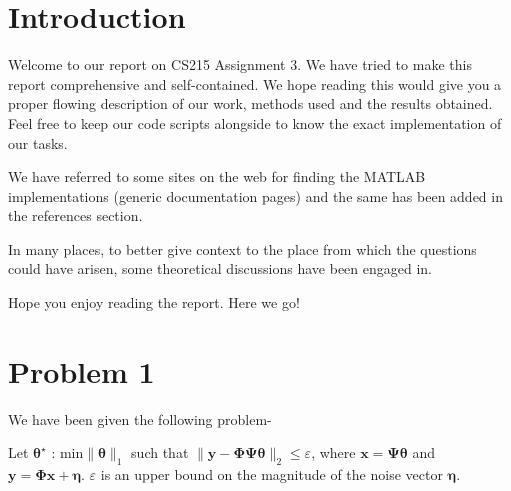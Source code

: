 \documentclass[a4paper,11pt]{article}
\numberwithin{definition}{section}
\numberwithin{mytheorem}{subsection}
\begin{document}




\date{Spring 2022}
\maketitle

\justifying
\tableofcontents

\newpage
\justifying
\section*{Introduction}

Welcome  to our report on CS215 Assignment 3. We have tried to make this report comprehensive and self-contained. We hope reading this would give you a proper flowing description of our work, methods used and the results obtained. Feel free to keep our code scripts alongside to know the exact implementation of our tasks. %

We have referred to some sites on the web for finding the MATLAB implementations (generic documentation pages) and the same has been added in the references section. %

In many places, to better give context to the place from which the questions could have arisen, some theoretical discussions have been engaged in.

Hope you enjoy reading the report. Here we go!


\section{Problem 1}
We have been given the following problem-

Let $\boldsymbol{\theta^{\star}}$ : $\textrm{min} \|\boldsymbol{\theta}\|_1$ such that $\|\boldsymbol{y}-\boldsymbol{\Phi \Psi \theta}\|_2 \leq \varepsilon$, where $\boldsymbol{x} = \boldsymbol{\Psi \theta}$ and $\boldsymbol{y} = \boldsymbol{\Phi x} + \boldsymbol{\eta}$. $\varepsilon$ is an upper bound on the magnitude of the noise vector $\boldsymbol{\eta}$.
\end{document}
